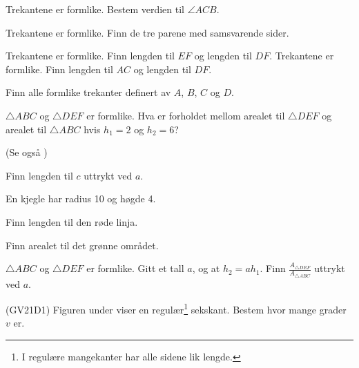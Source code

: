 




	
\opgt

Trekantene er formlike. Bestem verdien til $ \angle ACB $. \vs
{}

Trekantene er formlike. Finn de tre parene med samsvarende sider.

Trekantene er formlike. Finn lengden til $ EF $ og lengden til $ DF $.
\newpage
{}
Trekantene er formlike. Finn lengden til $ AC $ og lengden til $ DF $.

Finn alle formlike trekanter definert av $ A $, $ B $, $ C $ og $ D $.

$ \triangle ABC $ og $ \triangle DEF $ er formlike. Hva er forholdet mellom arealet til $ \triangle DEF $ og arealet til $ \triangle ABC $ hvis $ h_1=2 $ og $ h_2=6 $? \vsk

(Se også )

\newpage
{}
Finn lengden til $ c $ uttrykt ved $ a $.


En kjegle har radius 10 og høgde 4.

 \vs
{}

\newpage

Finn lengden til den røde linja.


Finn arealet til det grønne området.


$ \triangle ABC $ og $ \triangle DEF $ er formlike. Gitt et tall $ a $, og at $ {h_2=a h_1} $. Finn $ \frac{A_{\triangle DEF}}{A_{\triangle ABC} } $ uttrykt ved $ a $.

\newpage
{}
(GV21D1) \os
Figuren under viser en regulær\footnote{I regulære mangekanter har alle sidene lik lengde.} sekskant. Bestem hvor mange grader $  v $ er.



